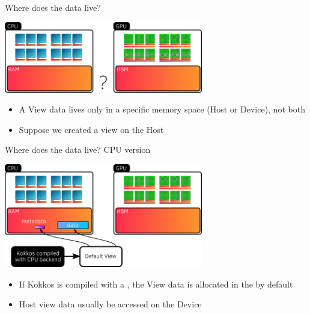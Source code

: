 \documentclass[
    aspectratio=169,
]{beamer}
\begin{document}

\begin{frame}{Where does the data live?}
    \begin{center}
        \includegraphics[width=0.65\textwidth]{view_memory.png}
    \end{center}
    \begin{itemize}
        \item A View data lives only in a specific memory space (Host or Device), not both
        \item Suppose we created a view on the Host
    \end{itemize}
\end{frame}


\begin{frame}{Where does the data live? CPU version}
    \begin{center}
        \includegraphics[width=0.65\textwidth]{host_view_memory.png}
    \end{center}
    \begin{itemize}
        \item If Kokkos is compiled with a , the View data is allocated in the  by default
        \item Host view data usually  be accessed on the Device
    \end{itemize}
\end{frame}

\end{document}
